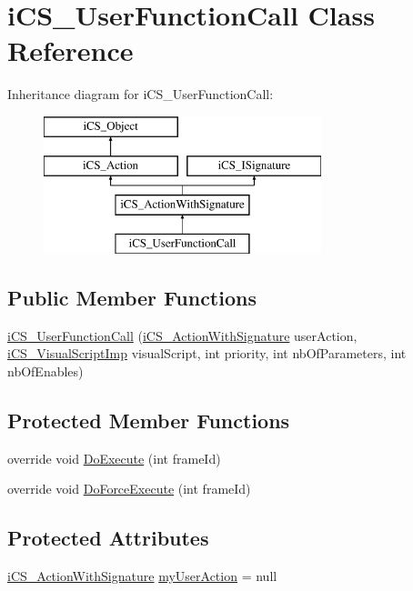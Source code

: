 \hypertarget{classi_c_s___user_function_call}{\section{i\+C\+S\+\_\+\+User\+Function\+Call Class Reference}
\label{classi_c_s___user_function_call}
}
Inheritance diagram for i\+C\+S\+\_\+\+User\+Function\+Call\+:\begin{figure}[H]
\begin{center}
\leavevmode
\includegraphics[height=4.000000cm]{classi_c_s___user_function_call}
\end{center}
\end{figure}
\subsection*{Public Member Functions}
\begin{DoxyCompactItemize}
\item 
\hyperlink{classi_c_s___user_function_call_a5e4d2065b499b8d7a0f00d0b8c7f6285}{i\+C\+S\+\_\+\+User\+Function\+Call} (\hyperlink{classi_c_s___action_with_signature}{i\+C\+S\+\_\+\+Action\+With\+Signature} user\+Action, \hyperlink{classi_c_s___visual_script_imp}{i\+C\+S\+\_\+\+Visual\+Script\+Imp} visual\+Script, int priority, int nb\+Of\+Parameters, int nb\+Of\+Enables)
\end{DoxyCompactItemize}
\subsection*{Protected Member Functions}
\begin{DoxyCompactItemize}
\item 
override void \hyperlink{classi_c_s___user_function_call_a4e6dcbf01ca0656824d54609592904d7}{Do\+Execute} (int frame\+Id)
\item 
override void \hyperlink{classi_c_s___user_function_call_a289d573a64811b03e2cf806d668f37bd}{Do\+Force\+Execute} (int frame\+Id)
\end{DoxyCompactItemize}
\subsection*{Protected Attributes}
\begin{DoxyCompactItemize}
\item 
\hyperlink{classi_c_s___action_with_signature}{i\+C\+S\+\_\+\+Action\+With\+Signature} \hyperlink{classi_c_s___user_function_call_ad1d01131ea4379284d42b209f7833d0f}{my\+User\+Action} = null
\end{DoxyCompactItemize}
